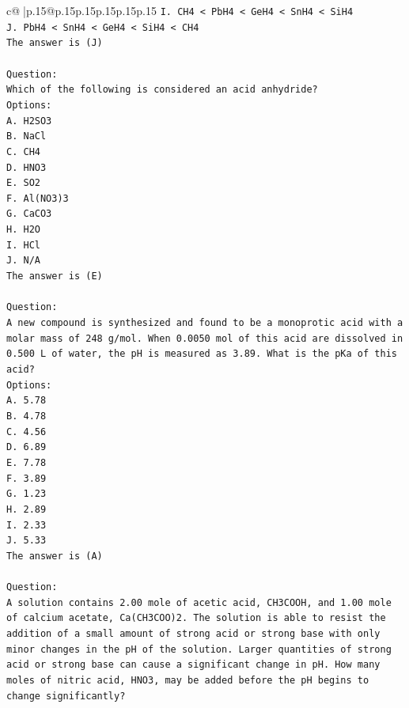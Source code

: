 \documentclass{article}
\begin{document}
{\begin{supertabular}{c@{$\;$}|p{.15\linewidth}@{}p{.15\linewidth}p{.15\linewidth}p{.15\linewidth}p{.15\linewidth}p{.15\linewidth}}
{{{\texttt{I. CH4 < PbH4 < GeH4 < SnH4 < SiH4} \\
\texttt{J. PbH4 < SnH4 < GeH4 < SiH4 < CH4} \\
\texttt{The answer is (J)} \\
\\ 
\texttt{Question:} \\
\texttt{Which of the following is considered an acid anhydride?} \\
\texttt{Options:} \\
\texttt{A. H2SO3} \\
\texttt{B. NaCl} \\
\texttt{C. CH4} \\
\texttt{D. HNO3} \\
\texttt{E. SO2} \\
\texttt{F. Al(NO3)3} \\
\texttt{G. CaCO3} \\
\texttt{H. H2O} \\
\texttt{I. HCl} \\
\texttt{J. N/A} \\
\texttt{The answer is (E)} \\
\\ 
\texttt{Question:} \\
\texttt{A new compound is synthesized and found to be a monoprotic acid with a molar mass of 248 g/mol. When 0.0050 mol of this acid are dissolved in 0.500 L of water, the pH is measured as 3.89. What is the pKa of this acid?} \\
\texttt{Options:} \\
\texttt{A. 5.78} \\
\texttt{B. 4.78} \\
\texttt{C. 4.56} \\
\texttt{D. 6.89} \\
\texttt{E. 7.78} \\
\texttt{F. 3.89} \\
\texttt{G. 1.23} \\
\texttt{H. 2.89} \\
\texttt{I. 2.33} \\
\texttt{J. 5.33} \\
\texttt{The answer is (A)} \\
\\ 
\texttt{Question:} \\
\texttt{A solution contains 2.00 mole of acetic acid, CH3COOH, and 1.00 mole of calcium acetate, Ca(CH3COO)2. The solution is able to resist the addition of a small amount of strong acid or strong base with only minor changes in the pH of the solution. Larger quantities of strong acid or strong base can cause a significant change in pH. How many moles of nitric acid, HNO3, may be added before the pH begins to change significantly?} \\
}}}
\end{supertabular}}
\end{document}
